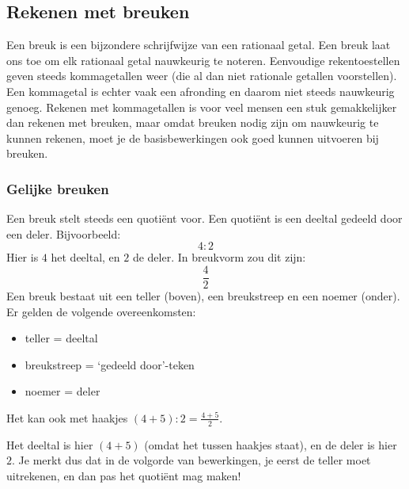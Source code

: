 \subsection{Rekenen met breuken}

Een breuk is een bijzondere schrijfwijze van een rationaal getal. Een breuk laat ons toe om elk rationaal getal nauwkeurig te noteren. Eenvoudige rekentoestellen geven steeds kommagetallen weer (die al dan niet rationale getallen voorstellen). Een kommagetal is echter vaak een afronding en daarom niet steeds nauwkeurig genoeg. Rekenen met kommagetallen is voor veel mensen een stuk gemakkelijker dan rekenen met breuken, maar omdat breuken nodig zijn om nauwkeurig te kunnen rekenen, moet je de basisbewerkingen ook goed kunnen uitvoeren bij breuken.

\subsubsection{Gelijke breuken}


Een breuk stelt steeds een quoti\"ent voor. Een quoti\"ent is een deeltal gedeeld door een deler. Bijvoorbeeld:
\begin{equation*}
4:2
\end{equation*}
Hier is $4$ het deeltal, en $2$ de deler. In breukvorm zou dit zijn:
\begin{equation*}
\frac{4}{2}
\end{equation*}
Een breuk bestaat uit een teller (boven), een breukstreep en een noemer (onder). Er gelden de volgende overeenkomsten:

\begin{itemize}
	\item teller = deeltal
	\item breukstreep = \textquoteleft gedeeld door\textquoteright-teken
	\item noemer = deler
\end{itemize}
Het kan ook met haakjes $(4+5):2=\frac{4+5}{2}$.

Het deeltal is hier $(4+5)$ (omdat het tussen haakjes staat), en de deler is hier $2$. Je merkt dus dat in de volgorde van bewerkingen, je eerst de teller moet uitrekenen, en dan pas het quoti\"ent mag maken!

